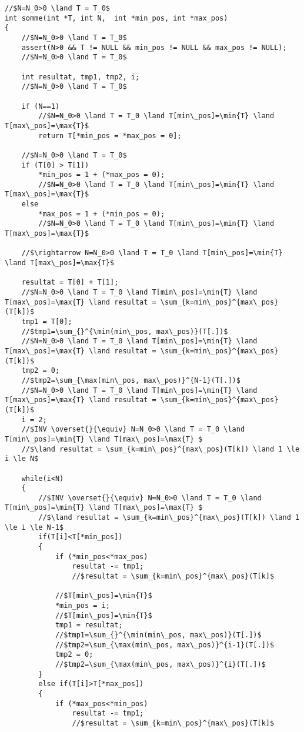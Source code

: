 \begin{lstlisting}[caption={somme.c}]
//$N=N_0>0 \land T = T_0$
int somme(int *T, int N,  int *min_pos, int *max_pos)
{
    //$N=N_0>0 \land T = T_0$
    assert(N>0 && T != NULL && min_pos != NULL && max_pos != NULL);
    //$N=N_0>0 \land T = T_0$

    int resultat, tmp1, tmp2, i;
    //$N=N_0>0 \land T = T_0$

    if (N==1) 
        //$N=N_0>0 \land T = T_0 \land T[min\_pos]=\min{T} \land T[max\_pos]=\max{T}$
        return T[*min_pos = *max_pos = 0];
    
    //$N=N_0>0 \land T = T_0$
    if (T[0] > T[1])
        *min_pos = 1 + (*max_pos = 0);
        //$N=N_0>0 \land T = T_0 \land T[min\_pos]=\min{T} \land T[max\_pos]=\max{T}$
    else
        *max_pos = 1 + (*min_pos = 0);
        //$N=N_0>0 \land T = T_0 \land T[min\_pos]=\min{T} \land T[max\_pos]=\max{T}$
    
    //$\rightarrow N=N_0>0 \land T = T_0 \land T[min\_pos]=\min{T} \land T[max\_pos]=\max{T}$

    resultat = T[0] + T[1];
    //$N=N_0>0 \land T = T_0 \land T[min\_pos]=\min{T} \land T[max\_pos]=\max{T} \land resultat = \sum_{k=min\_pos}^{max\_pos}(T[k])$
    tmp1 = T[0];
    //$tmp1=\sum_{}^{\min(min\_pos, max\_pos)}(T[.])$
    //$N=N_0>0 \land T = T_0 \land T[min\_pos]=\min{T} \land T[max\_pos]=\max{T} \land resultat = \sum_{k=min\_pos}^{max\_pos}(T[k])$
    tmp2 = 0;
    //$tmp2=\sum_{\max(min\_pos, max\_pos)}^{N-1}(T[.])$
    //$N=N_0>0 \land T = T_0 \land T[min\_pos]=\min{T} \land T[max\_pos]=\max{T} \land resultat = \sum_{k=min\_pos}^{max\_pos}(T[k])$
    i = 2;
    //$INV \overset{}{\equiv} N=N_0>0 \land T = T_0 \land T[min\_pos]=\min{T} \land T[max\_pos]=\max{T} $
    //$\land resultat = \sum_{k=min\_pos}^{max\_pos}(T[k]) \land 1 \le i \le N$

    while(i<N) 
    {
        //$INV \overset{}{\equiv} N=N_0>0 \land T = T_0 \land T[min\_pos]=\min{T} \land T[max\_pos]=\max{T} $
        //$\land resultat = \sum_{k=min\_pos}^{max\_pos}(T[k]) \land 1 \le i \le N-1$
        if(T[i]<T[*min_pos])
        {
            if (*min_pos<*max_pos) 
                resultat -= tmp1;
                //$resultat = \sum_{k=min\_pos}^{max\_pos}(T[k]$
            
            //$T[min\_pos]=\min{T}$
            *min_pos = i;
            //$T[min\_pos]=\min{T}$
            tmp1 = resultat;
            //$tmp1=\sum_{}^{\min(min\_pos, max\_pos)}(T[.])$
            //$tmp2=\sum_{\max(min\_pos, max\_pos)}^{i-1}(T[.])$
            tmp2 = 0;
            //$tmp2=\sum_{\max(min\_pos, max\_pos)}^{i}(T[.])$
        }
        else if(T[i]>T[*max_pos])
        {
            if (*max_pos<*min_pos) 
                resultat -= tmp1;
                //$resultat = \sum_{k=min\_pos}^{max\_pos}(T[k]$
            

\end{lstlisting}
